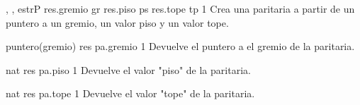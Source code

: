 {, , }{estrP}
{
	\state res.gremio \asig gr										
	\state res.piso \asig ps										
	\state res.tope \asig tp										
}
{1}
{Crea una paritaria a partir de un puntero a un gremio, un valor piso y un valor tope.}

{}{puntero(gremio)}
{
	\state res \asig pa.gremio										
}
{1}
{Devuelve el puntero a el gremio de la paritaria.}

{}{nat}
{
	\state res \asig pa.piso										
}
{1}
{Devuelve el valor "piso" de la paritaria.}

{}{nat}
{
	\state res \asig pa.tope										
}
{1}
{Devuelve el valor "tope" de la paritaria.}